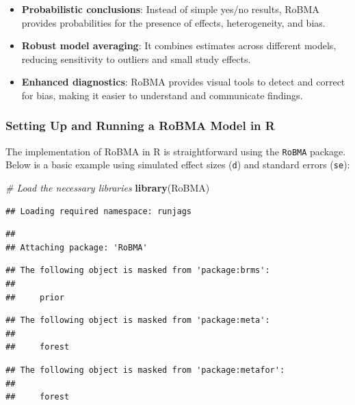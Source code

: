 \documentclass[
]{book}
\newenvironment{Shaded}{\begin{snugshade}}{\end{snugshade}}
\newcommand{\CommentTok}[1]{\textcolor[rgb]{0.56,0.35,0.01}{\textit{#1}}}
\newcommand{\FunctionTok}[1]{\textcolor[rgb]{0.13,0.29,0.53}{\textbf{#1}}}
\newcommand{\NormalTok}[1]{#1}
\begin{document}
\begin{itemize}
\item
  \textbf{Probabilistic conclusions}: Instead of simple yes/no results, RoBMA provides probabilities for the presence of effects, heterogeneity, and bias.
\item
  \textbf{Robust model averaging}: It combines estimates across different models, reducing sensitivity to outliers and small study effects.
\item
  \textbf{Enhanced diagnostics}: RoBMA provides visual tools to detect and correct for bias, making it easier to understand and communicate findings.
\end{itemize}

\subsubsection{Setting Up and Running a RoBMA Model in R}\label{setting-up-and-running-a-robma-model-in-r}

The implementation of RoBMA in R is straightforward using the \texttt{RoBMA} package. Below is a basic example using simulated effect sizes (\texttt{d}) and standard errors (\texttt{se}):

\begin{Shaded}
\begin{Highlighting}[]
\CommentTok{\# Load the necessary libraries}
\FunctionTok{library}\NormalTok{(RoBMA)}
\end{Highlighting}
\end{Shaded}

\begin{verbatim}
## Loading required namespace: runjags
\end{verbatim}

\begin{verbatim}
## 
## Attaching package: 'RoBMA'
\end{verbatim}

\begin{verbatim}
## The following object is masked from 'package:brms':
## 
##     prior
\end{verbatim}

\begin{verbatim}
## The following object is masked from 'package:meta':
## 
##     forest
\end{verbatim}

\begin{verbatim}
## The following object is masked from 'package:metafor':
## 
##     forest
\end{verbatim}
\end{document}
